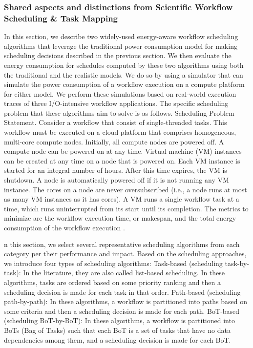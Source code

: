 \subsubsection{Shared aspects and distinctions from Scientific Workflow Scheduling \& Task Mapping}
\label{sec:background_colocation_scheduling}
In this section, we describe two widely-used energy-aware workflow scheduling algorithms that leverage the traditional power consumption model for making scheduling decisions described in the previous section. We then evaluate the energy consumption for schedules computed by these two algorithms using both the traditional and the realistic models. We do so by using a simulator that can simulate the power consumption of a workflow execution on a compute platform for either model. We perform these simulations based on real-world execution traces of three I/O-intensive workflow applications. The specific scheduling problem that these algorithms aim to solve is as follows.
Scheduling Problem Statement. Consider a workflow that consist of single-threaded tasks. This workflow must be executed on a cloud platform that comprises homogeneous, multi-core compute nodes. Initially, all compute nodes are powered off. A compute node can be powered on at any time. Virtual machine (VM) instances can be created at any time on a node that is powered on. Each VM instance is started for an integral number of hours. After this time expires, the VM is shutdown. A node is automatically powered off if it is not running any VM instance. The cores on a node are never oversubscribed (i.e., a node runs at most as many VM instances as it has cores). A VM runs a single workflow task at a time, which runs uninterrupted from its start until its completion. The metrics to minimize are the workflow execution time, or makespan, and the total energy consumption of the workflow execution \cite{HosseiniShirvani2024}.

n this section, we select several representative scheduling algorithms from each category per their performance and impact. Based on the scheduling approaches, we introduce four types of scheduling algorithms:
Task-based (scheduling task-by-task): In the literature, they are also called list-based scheduling. In these algorithms, tasks are ordered based on some priority ranking and then a scheduling decision is made for each task in that order. Path-based (scheduling path-by-path): In these algorithms, a workflow is partitioned into paths based on some criteria and then a scheduling decision is made for each path.
BoT-based (scheduling BoT-by-BoT): In these algorithms, a workflow is partitioned into BoTs (Bag of Tasks) such that each BoT is a set of tasks that have no data dependencies among them, and a scheduling decision is made for each BoT.

